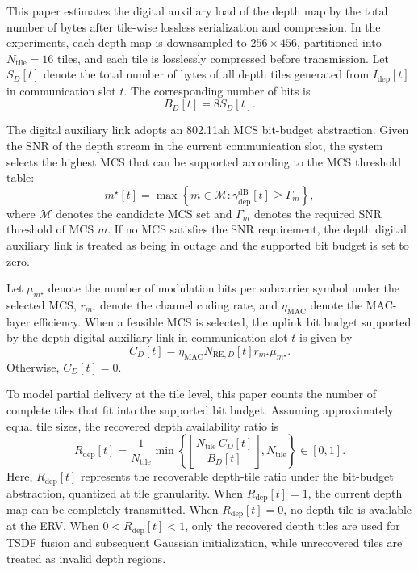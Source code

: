 \documentclass[journal]{IEEEtran}
\begin{document}
This paper estimates the digital auxiliary load of the depth map by the total number of bytes after tile-wise lossless serialization and compression.
In the experiments, each depth map is downsampled to $256\times456$, partitioned into $N_{\mathrm{tile}}=16$ tiles, and each tile is losslessly compressed before transmission.
Let $S_D[t]$ denote the total number of bytes of all depth tiles generated from $I_{\mathrm{dep}}[t]$ in communication slot $t$.
The corresponding number of bits is
\begin{equation}
B_D[t]
=
8S_D[t].
\end{equation}

The digital auxiliary link adopts an 802.11ah MCS bit-budget abstraction. 
Given the SNR of the depth stream in the current communication slot, the system selects the highest MCS that can be supported according to the MCS threshold table:
\begin{equation}
m^{\star}[t]
=
\max
\left\{
m\in\mathcal{M}:
\gamma_{\mathrm{dep}}^{\mathrm{dB}}[t]\ge\Gamma_m
\right\},
\end{equation}
where $\mathcal{M}$ denotes the candidate MCS set and $\Gamma_m$ denotes the required SNR threshold of MCS $m$. 
If no MCS satisfies the SNR requirement, the depth digital auxiliary link is treated as being in outage and the supported bit budget is set to zero.

Let $\mu_{m^{\star}}$ denote the number of modulation bits per subcarrier symbol under the selected MCS, $r_{m^{\star}}$ denote the channel coding rate, and $\eta_{\mathrm{MAC}}$ denote the MAC-layer efficiency. 
When a feasible MCS is selected, the uplink bit budget supported by the depth digital auxiliary link in communication slot $t$ is given by
\begin{equation}
C_D[t]
=
\eta_{\mathrm{MAC}}
N_{\mathrm{RE},D}[t]
r_{m^{\star}}
\mu_{m^{\star}}.
\end{equation}
Otherwise, $C_D[t]=0$.

To model partial delivery at the tile level, this paper counts the number of complete tiles that fit into the supported bit budget. Assuming approximately equal tile sizes, the recovered depth availability ratio is
\begin{equation}
R_{\mathrm{dep}}[t]
=
\frac{1}{N_{\mathrm{tile}}}
\min
\left\{
\left\lfloor
\frac{
N_{\mathrm{tile}}\,C_D[t]
}
{
B_D[t]
}
\right\rfloor,
N_{\mathrm{tile}}
\right\}
\in[0,1].
\end{equation}
Here, $R_{\mathrm{dep}}[t]$ represents the recoverable depth-tile ratio under the bit-budget abstraction, quantized at tile granularity.
When $R_{\mathrm{dep}}[t]=1$, the current depth map can be completely transmitted. 
When $R_{\mathrm{dep}}[t]=0$, no depth tile is available at the ERV. 
When $0<R_{\mathrm{dep}}[t]<1$, only the recovered depth tiles are used for TSDF fusion and subsequent Gaussian initialization, while unrecovered tiles are treated as invalid depth regions.
\end{document}
